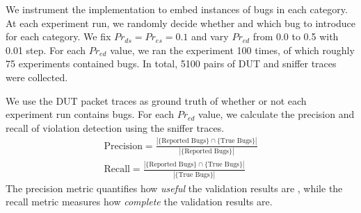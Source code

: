 We instrument the \ns{} implementation to embed instances of bugs in each
category. At each experiment run, we randomly decide whether and which bug to
introduce for each category. We fix $Pr_{ds}=Pr_{es}=0.1$ and vary $Pr_{ed}$
from 0.0 to 0.5 with 0.01 step. For each $Pr_{ed}$ value, we ran the experiment
100 times, of which roughly 75 experiments contained bugs. In total, 5100 pairs of
DUT and sniffer traces were collected.


We use the DUT packet traces as ground truth of whether or not each experiment
run contains bugs.
For each $Pr_{ed}$ value, we calculate the precision and recall of violation
detection using the sniffer traces.%
\begin{align}
  \text{Precision} = \frac{\left\vert \{\text{Reported Bugs}\} \cap \{\text{True Bugs}\}\right\vert}{\left\vert
  \{\text{Reported Bugs}\}\right\vert}\\
  \text{Recall} = \frac{\left\vert \{\text{Reported Bugs}\} \cap \{\text{True Bugs}\}\right\vert}{\left\vert
  \{\text{True Bugs}\}\right\vert}
\end{align}%
The precision metric quantifies how \textit{useful} the validation results are ,
while the recall metric measures how \textit{complete} the validation results
are.

